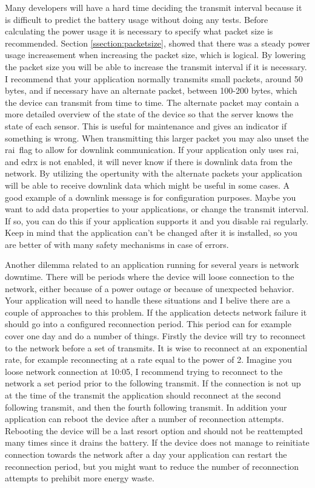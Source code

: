 \documentclass[USenglish]{ifimaster}  %
\begin{document}
Many developers will have a hard time deciding the transmit interval because it is difficult to predict the battery usage without doing any tests. Before calculating the power usage it is necessary to specify what packet size is recommended. Section \vref{ssection:packetsize}, showed that there was a steady power usage increasement when increasing the packet size, which is logical. By lowering the packet size you will be able to increase the transmit interval if it is necessary. I recommend that your application normally transmits small packets, around 50 bytes, and if necessary have an alternate packet, between 100-200 bytes, which the device can transmit from time to time. The alternate packet may contain a more detailed overview of the state of the device so that the server knows the state of each sensor. This is useful for maintenance and gives an indicator if something is wrong. When transmitting this larger packet you may also unset the \acrshort{rai} flag to allow for downlink communication. If your application only uses \acrshort{rai}, and \acrshort{edrx} is not enabled, it will never know if there is downlink data from the network. By utilizing the opertunity with the alternate packets your application will be able to receive downlink data which might be useful in some cases. A good example of a downlink message is for configuration purposes. Maybe you want to add data properties to your applications, or change the transmit interval. If so, you can do this if your application supports it and you disable \acrshort{rai} regularly. Keep in mind that the application can't be changed after it is installed, so you are better of with many safety mechanisms in case of errors.

Another dilemma related to an application running for several years is network downtime. There will be periods where the device will loose connection to the network, either because of a power outage or because of unexpected behavior. Your application will need to handle these situations and I belive there are a couple of approaches to this problem. If the application detects network failure it should go into a configured reconnection period. This period can for example cover one day and do a number of things. Firstly the device will try to reconnect to the network before a set of transmits. It is wise to reconnect at an exponential rate, for example reconnecting at a rate equal to the power of 2. Imagine you loose network connection at 10:05, I recommend trying to reconnect to the network a set period prior to the following transmit. If the connection is not up at the time of the transmit the application should reconnect at the second following transmit, and then the fourth following transmit. In addition your application can reboot the device after a number of reconnection attempts. Rebooting the device will be a last resort option and should not be reattempted many times since it drains the battery. If the device does not manage to reinitiate connection towards the network after a day your application can restart the reconnection period, but you might want to reduce the number of reconnection attempts to prehibit more energy waste.
\end{document}
